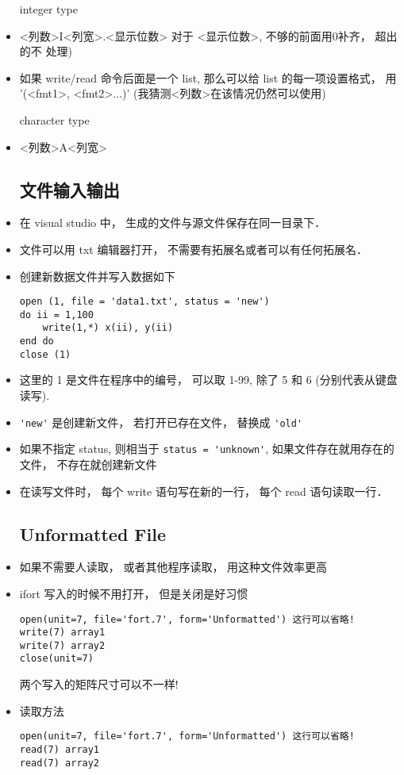 \begin{itemize}
integer type
\item <列数>I<列宽>.<显示位数>  对于 <显示位数>, 不够的前面用0补齐， 超出的不
   处理)
\item 如果 write/read 命令后面是一个 list, 那么可以给 list 的每一项设置格式， 用 '(<fmt1>, <fmt2>...)'  (我猜测<列数>在该情况仍然可以使用)

character type
\item <列数>A<列宽>

\subsection{文件输入输出}
\item 在 visual studio 中， 生成的文件与源文件保存在同一目录下．
\item 文件可以用 txt 编辑器打开， 不需要有拓展名或者可以有任何拓展名．
\item 创建新数据文件并写入数据如下
\begin{lstlisting}
open (1, file = 'data1.txt', status = 'new')
do ii = 1,100
	write(1,*) x(ii), y(ii)
end do
close (1)
\end{lstlisting}
\item 这里的 1 是文件在程序中的编号， 可以取 1-99, 除了 5 和 6 (分别代表从键盘读写).
\item \verb|'new'| 是创建新文件， 若打开已存在文件， 替换成 \verb|'old'|
\item 如果不指定 status, 则相当于 \verb|status = 'unknown'|, 如果文件存在就用存在的文件， 不存在就创建新文件
\item 在读写文件时， 每个 write 语句写在新的一行， 每个 read 语句读取一行．

\subsection{Unformatted File}
\item 如果不需要人读取， 或者其他程序读取， 用这种文件效率更高
\item ifort 写入的时候不用打开， 但是关闭是好习惯
\begin{lstlisting}
open(unit=7, file='fort.7', form='Unformatted') 这行可以省略!
write(7) array1
write(7) array2
close(unit=7)
\end{lstlisting}
两个写入的矩阵尺寸可以不一样!

\item 读取方法
\begin{lstlisting}
open(unit=7, file='fort.7', form='Unformatted') 这行可以省略!
read(7) array1
read(7) array2
\end{lstlisting}
\end{itemize}

